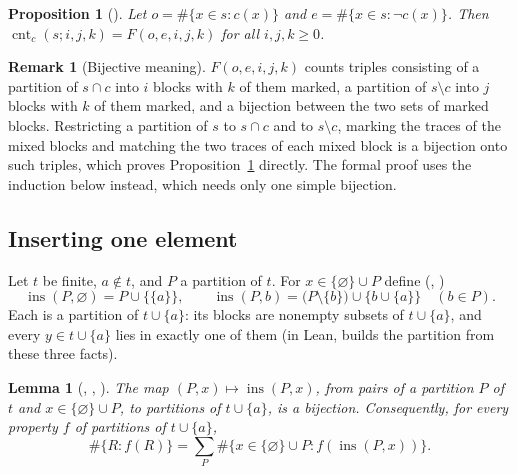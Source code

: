 \documentclass[11pt]{amsart}
\theoremstyle{plain}
\newtheorem{lemma}[theorem]{Lemma}
\newtheorem{proposition}[theorem]{Proposition}
\theoremstyle{definition}
\newtheorem{remark}[theorem]{Remark}
\newcommand{\cnt}{\operatorname{cnt}}
\newcommand{\ins}{\operatorname{ins}}
\begin{document}
\begin{proposition}[]\label{prop:refined}
Let $o=\#\{x\in s:c(x)\}$ and $e=\#\{x\in s:\neg c(x)\}$. Then $\cnt_c(s;i,j,k)=F(o,e,i,j,k)$ for all $i,j,k\ge0$.
\end{proposition}

\begin{remark}[Bijective meaning]\label{rem:bij}
$F(o,e,i,j,k)$ counts triples consisting of a partition of $s\cap c$ into $i$ blocks with $k$ of them marked, a partition of $s\setminus c$ into $j$ blocks with $k$ of them marked, and a bijection between the two sets of marked blocks.
Restricting a partition of $s$ to $s\cap c$ and to $s\setminus c$, marking the traces of the mixed blocks and matching the two traces of each mixed block is a bijection onto such triples, which proves Proposition~\ref{prop:refined} directly.
The formal proof uses the induction below instead, which needs only one simple bijection.
\end{remark}

\subsection{Inserting one element}
Let $t$ be finite, $a\notin t$, and $P$ a partition of $t$. For $x\in\{\varnothing\}\cup P$ define (, )
\[
  \ins(P,\varnothing)=P\cup\bigl\{\{a\}\bigr\},\qquad
  \ins(P,b)=\bigl(P\setminus\{b\}\bigr)\cup\bigl\{b\cup\{a\}\bigr\}\quad(b\in P).
\]
Each is a partition of $t\cup\{a\}$: its blocks are nonempty subsets of $t\cup\{a\}$, and every $y\in t\cup\{a\}$ lies in exactly one of them (in Lean,  builds the partition from these three facts).

\begin{lemma}[, , ]\label{lem:ins}
The map $(P,x)\mapsto\ins(P,x)$, from pairs of a partition $P$ of $t$ and $x\in\{\varnothing\}\cup P$, to partitions of $t\cup\{a\}$, is a bijection. Consequently, for every property $f$ of partitions of $t\cup\{a\}$,
\[
  \#\{R: f(R)\}=\sum_{P}\#\bigl\{x\in\{\varnothing\}\cup P: f(\ins(P,x))\bigr\}.
\]
\end{lemma}
\end{document}
